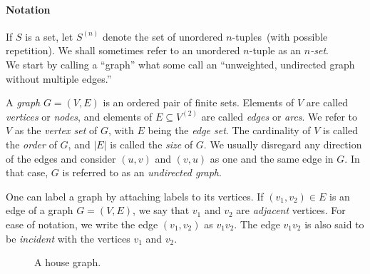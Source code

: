 \paragraph{Notation}
If $S$ is a set, let $S^{(n)}$ denote the set of unordered
$n$-tuples~(with possible repetition). We shall sometimes
refer to an unordered $n$-tuple as an
\emph{$n$-set}. \\

\noindent
We start by calling a ``graph'' what some call an
``unweighted,
undirected graph without
multiple edges.''

\begin{definition}
\rm
A \emph{graph} $G = (V, E)$ is an ordered pair of finite
sets. Elements of $V$ are called \emph{vertices} or
\emph{nodes}, and elements of $E \subseteq V^{(2)}$ are
called \emph{edges} or \emph{arcs}. We refer
to $V$ as the \emph{vertex set} of $G$, with $E$
being the \emph{edge set}. The cardinality of $V$ is
called the \emph{order} of $G$, and $|E|$ is called the
\emph{size} of $G$. We usually disregard any direction of
the edges and consider $(u,v)$ and $(v,u)$ as one and the same edge in
$G$. In that case, $G$ is referred to as an
\emph{undirected graph}.
\end{definition}

One can label a graph by attaching labels to its vertices.
If $(v_1, v_2) \in E$ is an edge of a graph $G = (V, E)$, we say that
$v_1$ and $v_2$ are \emph{adjacent}
vertices. For ease of notation, we write the edge $(v_1, v_2)$ as
$v_1 v_2$. The edge $v_1 v_2$ is also said to be
\emph{incident} with the vertices $v_1$ and
$v_2$.

\begin{figure}[!htbp]
\centering
{}

\caption{A house graph.}
\label{fig:introduction:house_graph}
\end{figure}

